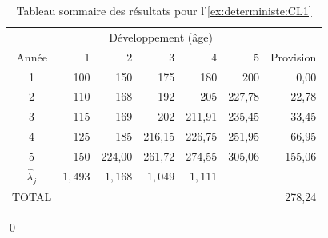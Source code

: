 \begin{exemple}
  \begin{table}
    \centering
    \caption{Tableau sommaire des résultats pour
      l'\autoref{ex:deterministe:CL1}}
    \label{tab:deterministe:CL1:resultats}
    \begin{tabular}{crrrrrr}
      \toprule
      & \multicolumn{5}{c}{Développement (âge)} \\
      Année & 1 & 2 & 3 & 4 & 5 & Provision \\
      \midrule
      1 & 100 & 150    & 175    & 180    & 200    &   0,00 \\
      2 & 110 & 168    & 192    & 205    & 227,78 &  22,78 \\
      3 & 115 & 169    & 202    & 211,91 & 235,45 &  33,45 \\
      4 & 125 & 185    & 216,15 & 226,75 & 251,95 &  66,95 \\
      5 & 150 & 224,00 & 261,72 & 274,55 & 305,06 & 155,06 \\
      \midrule
      $\hat{\lambda}_j$ & $1,493$ & $1,168$ & $1,049$ & $1,111$ \\
      \midrule
      TOTAL & & & & & & 278,24 \\
      \bottomrule
    \end{tabular}
  \end{table}
  \qed
\end{exemple}

